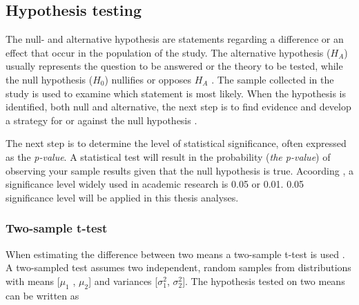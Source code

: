 
\subsection{Hypothesis testing}\label{sec:hypothesistesting}
The null- and alternative hypothesis are statements regarding a difference or an effect that occur in the population of the study. The alternative hypothesis ($H_A$) usually represents the question to be answered or the theory to be tested, while the null hypothesis ($H_{0}$) nullifies or opposes $H_A$ \citep{Walpole2012}. The sample collected in the study is used to examine which statement is most likely. When the hypothesis is identified, both null and alternative, the next step is to find evidence and develop a strategy for or against the null hypothesis \citep{LundResearchLtd2013}.

The next step is to determine the level of statistical significance, often expressed as the \textit{p-value}. A statistical test will result in the probability (\textit{the p-value}) of observing your sample results given that the null hypothesis is true. Acoording \citep{Walpole2012}, a significance level widely used in academic research is 0.05 or 0.01. 0.05 significance level will be applied in this thesis analyses.


\subsubsection{Two-sample t-test}\label{sec:t-test}
When estimating the difference between two means a two-sample t-test is used \citep{Walpole2012}. A two-sampled test assumes two independent, random samples from distributions with means [$\mu_{1}$ , $\mu_{2}$] and variances [$\sigma_{1}^{2}$, $\sigma_{2}^{2}$]. %
The hypothesis tested on two means can be written as\newline

